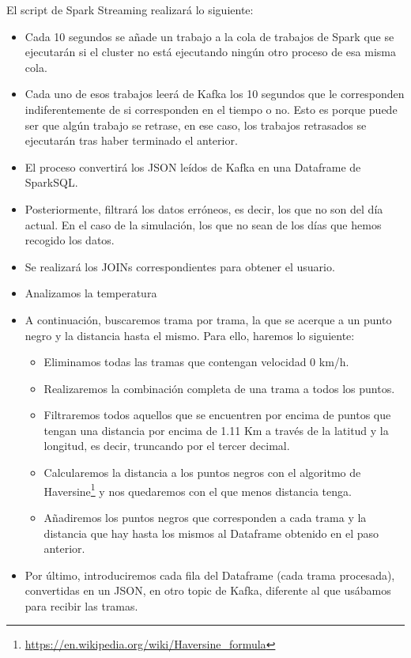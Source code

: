 El script de Spark Streaming realizará lo siguiente:

\begin{itemize} 
	\item Cada 10 segundos se añade un trabajo a la cola de trabajos de Spark que se ejecutarán si el cluster no está ejecutando ningún otro proceso de esa misma cola.
	\item Cada uno de esos trabajos leerá de Kafka los 10 segundos que le corresponden indiferentemente de si corresponden en el tiempo o no. Esto es porque puede ser que algún trabajo se retrase, en ese caso, los trabajos retrasados se ejecutarán tras haber terminado el anterior.
	\item El proceso convertirá los JSON leídos de Kafka en una Dataframe de SparkSQL.
	\item Posteriormente, filtrará los datos erróneos, es decir, los que no son del día actual. En el caso de la simulación, los que no sean de los días que hemos recogido los datos.
	\item Se realizará los JOINs correspondientes para obtener el usuario.
	\item Analizamos la temperatura 
	\item A continuación, buscaremos trama por trama, la que se acerque a un punto negro y la distancia hasta el mismo. Para ello, haremos lo siguiente:
	\begin{itemize}
		\item Eliminamos todas las tramas que contengan velocidad 0 km/h.
		\item Realizaremos la combinación completa de una trama a todos los puntos.
		\item Filtraremos todos aquellos que se encuentren por encima de puntos que tengan una distancia por encima de 1.11 Km a través de la latitud y la longitud, es decir, truncando por el tercer decimal.
		\item Calcularemos la distancia a los puntos negros con el algoritmo de Haversine\footnote{\url{https://en.wikipedia.org/wiki/Haversine_formula}} y nos quedaremos con el que menos distancia tenga.
		\item Añadiremos los puntos negros que corresponden a cada trama y la distancia que hay hasta los mismos al Dataframe obtenido en el paso anterior.
	\end{itemize}
	\item Por último, introduciremos cada fila del Dataframe (cada trama procesada), convertidas en un JSON, en otro topic de Kafka, diferente al que usábamos para recibir las tramas.
\end{itemize}


